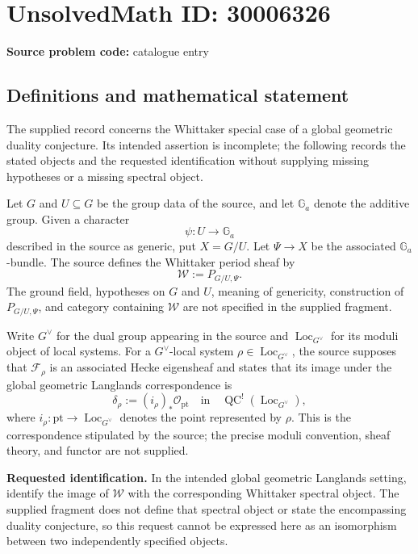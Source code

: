 \documentclass[11pt]{article}
\begin{document}
\section*{UnsolvedMath ID: 30006326}
\textbf{Source problem code:} catalogue entry
\subsection{Definitions and mathematical statement}
The supplied record concerns the Whittaker special case of a global geometric duality conjecture. Its intended assertion is incomplete; the following records the stated objects and the requested identification without supplying missing hypotheses or a missing spectral object.

Let \(G\) and \(U\subseteq G\) be the group data of the source, and let \(\mathbb G_a\) denote the additive group. Given a character
\[
\psi\colon U\longrightarrow\mathbb G_a
\]
described in the source as generic, put \(X=G/U\). Let \(\Psi\to X\) be the associated \(\mathbb G_a\)-bundle. The source defines the Whittaker period sheaf by
\[
\mathcal W:=P_{G/U,\Psi}.
\]
The ground field, hypotheses on \(G\) and \(U\), meaning of genericity, construction of \(P_{G/U,\Psi}\), and category containing \(\mathcal W\) are not specified in the supplied fragment.

Write \(G^\vee\) for the dual group appearing in the source and \(\operatorname{Loc}_{G^\vee}\) for its moduli object of local systems. For a \(G^\vee\)-local system \(\rho\in\operatorname{Loc}_{G^\vee}\), the source supposes that \(\mathcal F_\rho\) is an associated Hecke eigensheaf and states that its image under the global geometric Langlands correspondence is
\[
\delta_\rho:=(i_\rho)_*\mathcal O_{\mathrm{pt}}
\quad\text{in}\quad
\operatorname{QC}^{!}(\operatorname{Loc}_{G^\vee}),
\]
where \(i_\rho\colon\mathrm{pt}\to\operatorname{Loc}_{G^\vee}\) denotes the point represented by \(\rho\). This is the correspondence stipulated by the source; the precise moduli convention, sheaf theory, and functor are not supplied.

\textbf{Requested identification.} In the intended global geometric Langlands setting, identify the image of \(\mathcal W\) with the corresponding Whittaker spectral object. The supplied fragment does not define that spectral object or state the encompassing duality conjecture, so this request cannot be expressed here as an isomorphism between two independently specified objects.
\end{document}

